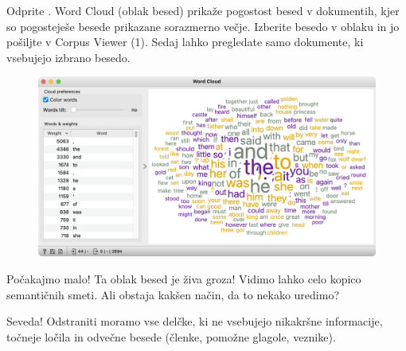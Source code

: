 Odprite . Word Cloud (oblak besed) prikaže pogostost besed v dokumentih, kjer so pogosteješe besede prikazane sorazmerno večje. Izberite besedo v oblaku in jo pošiljte v Corpus Viewer (1). Sedaj lahko pregledate samo dokumente, ki vsebujejo izbrano besedo.

\newpage

\begin{figure}[h]
  \centering
  \includegraphics[width=\linewidth]{word-cloud.png}
\end{figure}

Počakajmo malo! Ta oblak besed je živa groza! Vidimo lahko celo kopico semantičnih smeti. Ali obstaja kakšen način, da to nekako uredimo?

Seveda! Odstraniti moramo vse delčke, ki ne vsebujejo nikakršne informacije, točneje ločila in odvečne besede (členke, pomožne glagole, veznike).
